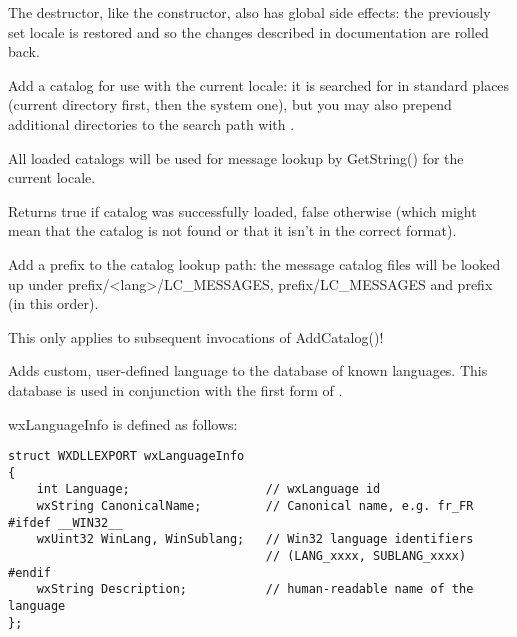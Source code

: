 The destructor, like the constructor, also has global side effects: the previously
set locale is restored and so the changes described in 
 documentation are rolled back.

\label{wxlocaleaddcatalog}


Add a catalog for use with the current locale: it is searched for in standard
places (current directory first, then the system one), but you may also prepend
additional directories to the search path with 
.

All loaded catalogs will be used for message lookup by GetString() for the
current locale.

Returns true if catalog was successfully loaded, false otherwise (which might
mean that the catalog is not found or that it isn't in the correct format).

\label{wxlocaleaddcataloglookuppathprefix}


Add a prefix to the catalog lookup path: the message catalog files will be
looked up under prefix/<lang>/LC\_MESSAGES, prefix/LC\_MESSAGES and prefix
(in this order).

This only applies to subsequent invocations of AddCatalog()!

\label{wxlocaleaddlanguage}


Adds custom, user-defined language to the database of known languages. This
database is used in conjunction with the first form of 
. 

wxLanguageInfo is defined as follows:

\begin{verbatim}
struct WXDLLEXPORT wxLanguageInfo
{
    int Language;                   // wxLanguage id
    wxString CanonicalName;         // Canonical name, e.g. fr_FR
#ifdef __WIN32__
    wxUint32 WinLang, WinSublang;   // Win32 language identifiers
                                    // (LANG_xxxx, SUBLANG_xxxx)
#endif
    wxString Description;           // human-readable name of the language
};
\end{verbatim}


